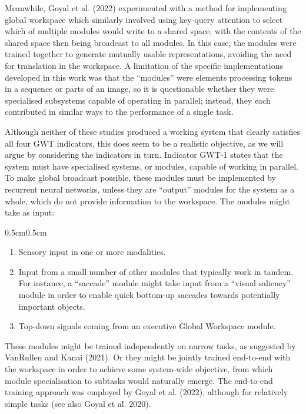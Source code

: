\documentclass[12pt]{article}
\begin{document}
Meanwhile, Goyal et al. (2022) experimented with a method for implementing global workspace which similarly involved using key-query attention to select which of multiple modules would write to a shared space, with the contents of the shared space then being broadcast to all modules. In this case, the modules were trained together to generate mutually usable representations, avoiding the need for translation in the workspace. A limitation of the specific implementations developed in this work was that the ``modules'' were elements processing tokens in a sequence or parts of an image, so it is questionable whether they were specialised subsystems capable of operating in parallel; instead, they each contributed in similar ways to the performance of a single task.

Although neither of these studies produced a working system that clearly satisfies all four GWT indicators, this does seem to be a realistic objective, as we will argue by considering the indicators in turn. Indicator GWT-1 states that the system must have specialised systems, or modules, capable of working in parallel. To make global broadcast possible, these modules must be implemented by recurrent neural networks, unless they are ``output'' modules for the system as a whole, which do not provide information to the workspace. The modules might take as input:

\begin{adjustwidth}{0.5cm}{0.5cm}

\begin{enumerate}
    \item Sensory input in one or more modalities.
    \item Input from a small number of other modules that typically work in tandem. For instance, a ``saccade'' module might take input from a ``visual saliency'' module in order to enable quick bottom-up saccades towards potentially important objects.
    \item Top-down signals coming from an executive Global Workspace module.
\end{enumerate}
\end{adjustwidth}

These modules might be trained independently on narrow tasks, as suggested by VanRullen and Kanai (2021). Or they might be jointly trained end-to-end with the workspace in order to achieve some system-wide objective, from which module specialisation to subtasks would naturally emerge. The end-to-end training approach was employed by Goyal et al. (2022), although for relatively simple tasks (see also Goyal et al. 2020).
\end{document}
